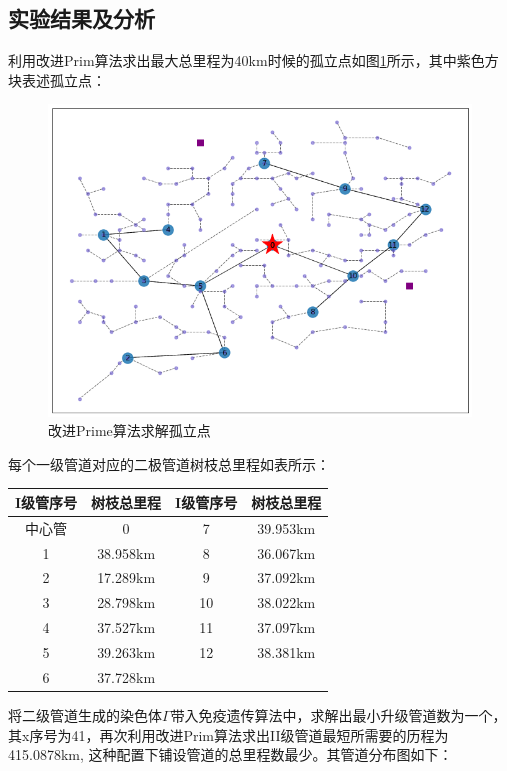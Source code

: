 \documentclass{whutmod}
\begin{document}
  	\subsection{实验结果及分析}
  	利用改进Prim算法求出最大总里程为40km时候的孤立点如图\ref{gld}所示，其中紫色方块表述孤立点：
  	 \begin{figure}[H]
  		\centering
  		\includegraphics[width=.7\textwidth]{figures/gld.png}
  		\caption{改进Prime算法求解孤立点}\label{gld}
  	\end{figure}
    每个一级管道对应的二极管道树枝总里程如表所示：
  \begin{table}[H]
  	\centering
  	\begin{tabular}{cccc}
  		\toprule[1.5pt]
  		\multicolumn{1}{m{3cm}}{\centering I级管序号} & \multicolumn{1}{m{3cm}}{\centering 树枝总里程} &
  		\multicolumn{1}{m{3cm}}{\centering I级管序号} &
  		\multicolumn{1}{m{3cm}}{\centering 树枝总里程} \\
  		\midrule[0.5pt]		
  		中心管 & 0 &7&39.953km \\ 
  		1  & 38.958km &8& 36.067km\\ 
  		2  & 17.289km &9&37.092km\\ 
  		3  & 28.798km &10& 38.022km\\ 
  		4 & 37.527km &11&37.097km \\ 
  		5  &39.263km &12& 38.381km\\ 
  		6  &37.728km &&\\ 
  		\bottomrule[1.5pt]
  	\end{tabular}
  \end{table}
  
  	将二级管道生成的染色体$\Gamma$带入免疫遗传算法中，求解出最小升级管道数为一个，其x序号为41，再次利用改进Prim算法求出II级管道最短所需要的历程为415.0878km, 这种配置下铺设管道的总里程数最少。其管道分布图如下：
  	
\end{document}
